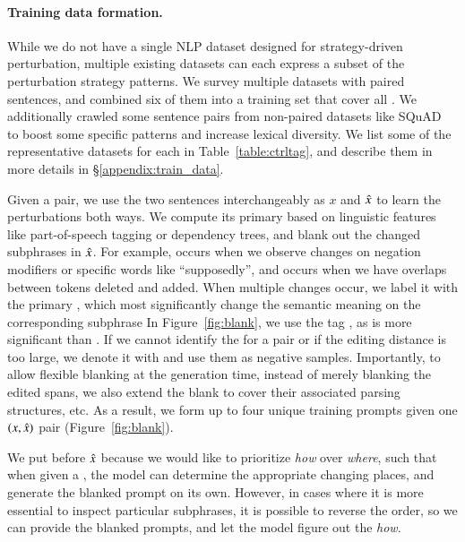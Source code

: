 \paragraph{Training data formation.}

While we do not have a single NLP dataset designed for strategy-driven perturbation, multiple existing datasets can each express a subset of the perturbation strategy patterns.
We survey multiple datasets with paired sentences, and combined six of them into a training set that cover all \tagstrs.
We additionally crawled some sentence pairs from non-paired datasets like SQuAD~\cite{rajpurkar-etal-2016-squad} to boost some specific patterns and increase lexical diversity. 
We list some of the representative datasets for each \tagstr in Table~\ref{table:ctrltag}, and describe them in more details in \S\ref{appendix:train_data}.

Given a pair, we use the two sentences interchangeably as $x$ and $\hat{x}$ to learn the perturbations both ways.
We compute its primary \tagstr based on linguistic features like part-of-speech tagging or dependency trees, and blank out the changed subphrases in $\hat{x}$.
For example,  occurs when we observe changes on negation modifiers or specific words like ``supposedly'', and  occurs when we have overlaps between tokens deleted and added.
When multiple changes occur, we label it with the primary \tagstr, which most significantly change the semantic meaning on the corresponding subphrase 
In Figure~\ref{fig:blank}, we use the tag , as  is more significant than .
If we cannot identify the \tagstr for a pair or if the editing distance is too large, we denote it with \ctrltag{[global]} and use them as negative samples.
Importantly, to allow flexible blanking at the generation time, instead of merely blanking the edited spans, we also extend the blank to cover their associated parsing structures, etc.
As a result, we form up to four unique training prompts given one $(x, \hat{x})$ pair (Figure~\ref{fig:blank}).


We put \tagstrs before $\hat{x}$ because we would like to prioritize \emph{how} over \emph{where}, such that when given a \tagstr, the model can determine the appropriate changing places, and generate the blanked prompt on its own. 
However, in cases where it is more essential to inspect particular subphrases, it is possible to reverse the order, so we can provide the blanked prompts, and let the model figure out the \emph{how}.

